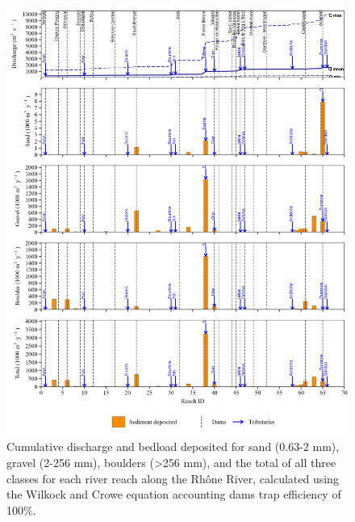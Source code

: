 \documentclass[
]{book}
\begin{document}
\begin{figure}
\includegraphics[width=26.24in]{img/res_cascade/res_E3_eW&C/plots_dep-silt/dep_res_sum_hy_E3_eW&C} \caption{Cumulative discharge and bedload deposited for sand (0.63-2 mm), gravel (2-256 mm), boulders (>256 mm), and the total of all three classes for each river reach along the Rhône River, calculated using the Wilkock and Crowe equation accounting dams trap efficiency of 100\%.}\label{fig:DepE3eW}
\end{figure}
\end{document}
